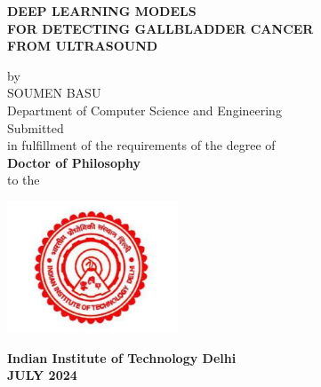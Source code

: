 
\begin{center}


\LARGE
\MakeUppercase{\textbf{DEEP LEARNING MODELS\\ FOR DETECTING GALLBLADDER CANCER\\ FROM ULTRASOUND}}\\
\vspace{1.3cm}

\large

{by}\\
\vspace{1cm}
{SOUMEN BASU}\\
\vspace{.2cm}
{Department of Computer Science and Engineering}\\
\vspace{1.1cm}
{Submitted}\\
\vspace{0.3cm}
{in fulfillment of the requirements of the degree of \\{\bf  Doctor of Philosophy}}\\
\vspace{0.4cm}
{to the }\\
\vspace{0.3cm}

\hspace{0cm}
\hbox{\includegraphics[width=12pc]{format/iitd-logo.pdf}}

\vspace{0.1cm}
{\bf
\large{Indian Institute of Technology Delhi}\\
\large{JULY 2024}\\
}


\end{center}


